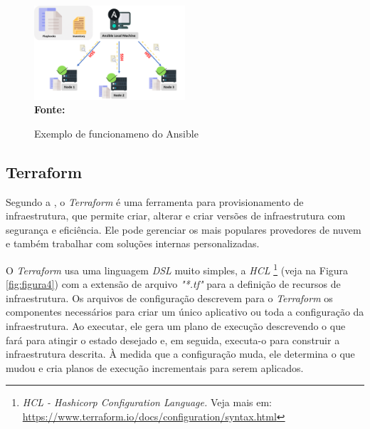  \begin{figure}[ht]
	\centering	
	\caption[\hspace{0.1cm}Exemplo de funcionameno do Ansible]{Exemplo de funcionameno do Ansible}
	\vspace{-0.4cm}
	\includegraphics[width=0.5\textwidth]{figuras/ansible-working.png}
	 \vspace{-0.2cm}
	\\\textbf{\footnotesize Fonte: \cite{intellipaat}}
	\label{fig:figura6}
\end{figure}
\vspace{-0.5cm}

\subsection{Terraform} \label{terraform} 

 Segundo a , o \textit{Terraform} é uma ferramenta para provisionamento de infraestrutura, que permite criar, alterar e criar versões de infraestrutura com segurança e eficiência. Ele pode gerenciar os mais populares provedores de nuvem e também trabalhar com soluções internas personalizadas.

O \textit{Terraform} usa uma linguagem \textit{DSL} muito simples, a \textit{HCL} \footnote{\textit{HCL - Hashicorp Configuration Language.} Veja mais em: \href{https://www.terraform.io/docs/configuration/syntax.html}{https://www.terraform.io/docs/configuration/syntax.html} } (veja na Figura \ref{fig:figura4}) com a extensão de arquivo \textit{"*.tf"} para a definição de recursos de infraestrutura. Os arquivos de configuração descrevem para o \textit{Terraform} os componentes necessários para criar um único aplicativo ou toda a configuração da infraestrutura. Ao executar, ele gera um plano de execução descrevendo o que fará para atingir o estado desejado e, em seguida, executa-o para construir a infraestrutura descrita. 
À medida que a configuração muda, ele determina o que mudou e cria planos de execução incrementais para serem aplicados.

